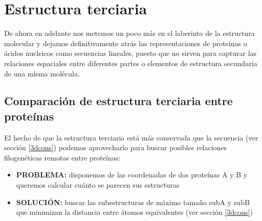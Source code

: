 \chapter{Estructura terciaria} \label{s3}

De ahora en adelante nos metemos un poco m\'{a}s en el laberinto de la estructura molecular y dejamos definitivamente atr\'{a}s las representaciones de prote\'{i}nas o \'{a}cidos nucleicos como secuencias lineales, puesto que no sirven para capturar las relaciones espaciales entre diferentes partes o elementos de estructura secundaria de una misma mol\'{e}cula.


\section{Comparaci\'{o}n de estructura terciaria entre prote\'{i}nas} \label{compS3}

El hecho de que la estructura terciaria est\'{a} m\'{a}s conservada que la secuencia (ver secci\'{o}n \ref{3dcons})
podemos aprovecharlo para buscar posibles relaciones filogen\'{e}ticas remotas entre prote\'{i}nas:

\begin{itemize}
\item \textbf{PROBLEMA:} disponemos de las coordenadas de dos prote\'{i}nas A y B y queremos calcular cu\'{a}nto se parecen sus estructuras
\item \textbf{SOLUCI\'{O}N:} buscar las subestructuras de m\'{a}ximo tama\~no subA y subB que minimizan la distancia entre \'{a}tomos equivalentes 
(ver secci\'{o}n \ref{3dcons})
\end{itemize}

